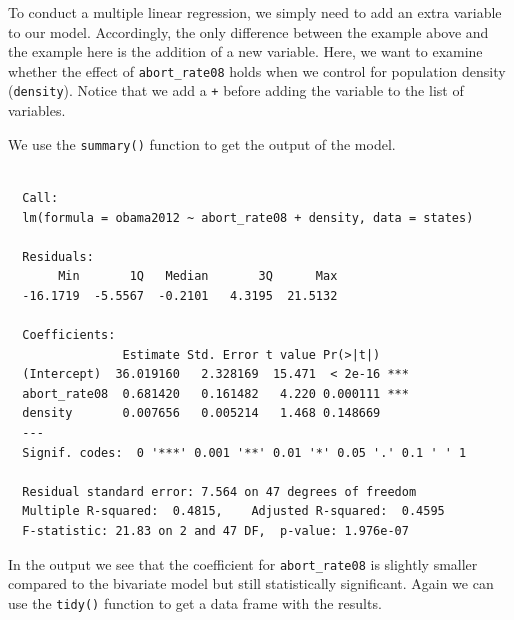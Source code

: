 \documentclass[12pt,oneside]{reedthesis}
\theoremstyle{definition}
\theoremstyle{definition}
\theoremstyle{definition}
\theoremstyle{remark}
\begin{document}
  To conduct a multiple linear regression, we simply need to add an extra
  variable to our model. Accordingly, the only difference between the
  example above and the example here is the addition of a new variable.
  Here, we want to examine whether the effect of \texttt{abort\_rate08}
  holds when we control for population density (\texttt{density}). Notice
  that we add a \texttt{+} before adding the variable to the list of
  variables.
  \begin{Shaded}
  \begin{Highlighting}[]
  \StringTok{ }\OperatorTok{~}\StringTok{ }\OperatorTok{+}\StringTok{ }
  \end{Highlighting}
  \end{Shaded}
  We use the \texttt{summary()} function to get the output of the model.
  \begin{Shaded}
  \begin{Highlighting}[]
  \end{Highlighting}
  \end{Shaded}
  \begin{verbatim}
  
  Call:
  lm(formula = obama2012 ~ abort_rate08 + density, data = states)
  
  Residuals:
       Min       1Q   Median       3Q      Max 
  -16.1719  -5.5567  -0.2101   4.3195  21.5132 
  
  Coefficients:
                Estimate Std. Error t value Pr(>|t|)    
  (Intercept)  36.019160   2.328169  15.471  < 2e-16 ***
  abort_rate08  0.681420   0.161482   4.220 0.000111 ***
  density       0.007656   0.005214   1.468 0.148669    
  ---
  Signif. codes:  0 '***' 0.001 '**' 0.01 '*' 0.05 '.' 0.1 ' ' 1
  
  Residual standard error: 7.564 on 47 degrees of freedom
  Multiple R-squared:  0.4815,    Adjusted R-squared:  0.4595 
  F-statistic: 21.83 on 2 and 47 DF,  p-value: 1.976e-07
  \end{verbatim}
  In the output we see that the coefficient for \texttt{abort\_rate08} is
  slightly smaller compared to the bivariate model but still statistically
  significant. Again we can use the \texttt{tidy()} function to get a data
  frame with the results.
  \begin{Shaded}
  \begin{Highlighting}[]
  \StringTok{ }
  \end{Highlighting}
  \end{Shaded}
\end{document}
